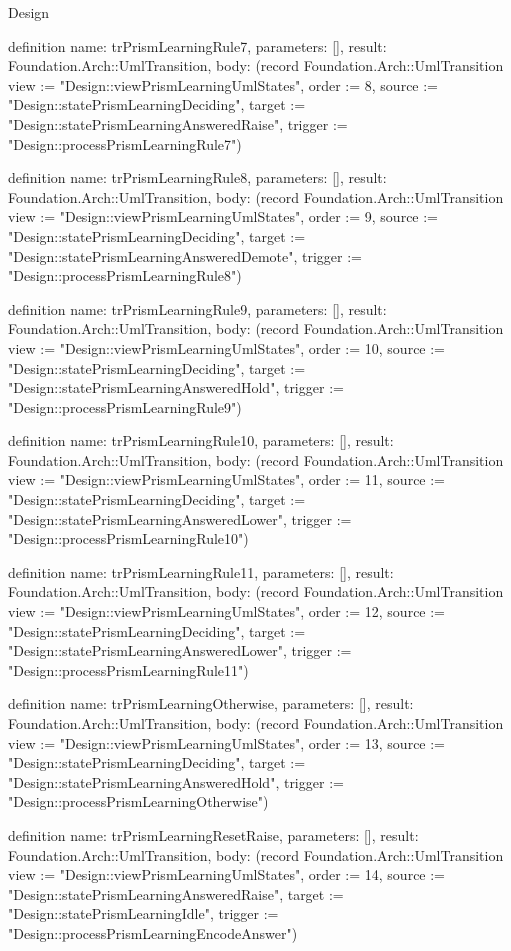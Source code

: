 \begin{lexlean}{Design}
\begin{semanticmodule}
definition{
  name: trPrismLearningRule7,
  parameters: [],
  result: Foundation.Arch::UmlTransition,
  body: (record Foundation.Arch::UmlTransition {view := "Design::viewPrismLearningUmlStates", order := 8, source := "Design::statePrismLearningDeciding", target := "Design::statePrismLearningAnsweredRaise", trigger := "Design::processPrismLearningRule7"})
}

definition{
  name: trPrismLearningRule8,
  parameters: [],
  result: Foundation.Arch::UmlTransition,
  body: (record Foundation.Arch::UmlTransition {view := "Design::viewPrismLearningUmlStates", order := 9, source := "Design::statePrismLearningDeciding", target := "Design::statePrismLearningAnsweredDemote", trigger := "Design::processPrismLearningRule8"})
}

definition{
  name: trPrismLearningRule9,
  parameters: [],
  result: Foundation.Arch::UmlTransition,
  body: (record Foundation.Arch::UmlTransition {view := "Design::viewPrismLearningUmlStates", order := 10, source := "Design::statePrismLearningDeciding", target := "Design::statePrismLearningAnsweredHold", trigger := "Design::processPrismLearningRule9"})
}

definition{
  name: trPrismLearningRule10,
  parameters: [],
  result: Foundation.Arch::UmlTransition,
  body: (record Foundation.Arch::UmlTransition {view := "Design::viewPrismLearningUmlStates", order := 11, source := "Design::statePrismLearningDeciding", target := "Design::statePrismLearningAnsweredLower", trigger := "Design::processPrismLearningRule10"})
}

definition{
  name: trPrismLearningRule11,
  parameters: [],
  result: Foundation.Arch::UmlTransition,
  body: (record Foundation.Arch::UmlTransition {view := "Design::viewPrismLearningUmlStates", order := 12, source := "Design::statePrismLearningDeciding", target := "Design::statePrismLearningAnsweredLower", trigger := "Design::processPrismLearningRule11"})
}

definition{
  name: trPrismLearningOtherwise,
  parameters: [],
  result: Foundation.Arch::UmlTransition,
  body: (record Foundation.Arch::UmlTransition {view := "Design::viewPrismLearningUmlStates", order := 13, source := "Design::statePrismLearningDeciding", target := "Design::statePrismLearningAnsweredHold", trigger := "Design::processPrismLearningOtherwise"})
}

definition{
  name: trPrismLearningResetRaise,
  parameters: [],
  result: Foundation.Arch::UmlTransition,
  body: (record Foundation.Arch::UmlTransition {view := "Design::viewPrismLearningUmlStates", order := 14, source := "Design::statePrismLearningAnsweredRaise", target := "Design::statePrismLearningIdle", trigger := "Design::processPrismLearningEncodeAnswer"})
}


\end{semanticmodule}
\end{lexlean}
